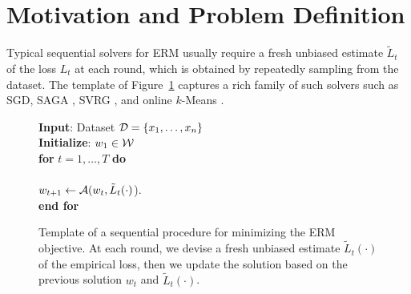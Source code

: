 
\section{Motivation and Problem Definition} \label{sec:Motivation}
Typical sequential solvers for ERM usually require a fresh unbiased estimate $\tilde{L}_t$  of the loss ${L}_t$ at each round, which is obtained by repeatedly sampling from the dataset.
The template of Figure~\ref{fig:ERM_Sequential} captures a rich family of such solvers such as SGD, SAGA \citep{defazio2014saga}, SVRG \citep{johnson2013accelerating}, and online $k$-Means \citep{bottou1995convergence}.

 
 
\begin{figure}[h]
\begin{framed}
 \flushleft
 \textbf{Input}: Dataset ${\mathcal{D}} = \{x_1,\ldots,x_n\}$ \\
  \textbf{Initialize}: $w_1 \in \mathcal{W}$ \\
   \textbf{for} $t=1,\ldots, T$ \textbf{do} \\
    \\
     $w_{t+1} \gets \mathcal{A}( w_t, \tilde{L}_t(\cdot)$). \\
   \textbf{end for} \\
\end{framed}
\caption{ Template of a sequential  procedure for minimizing the ERM objective.
At each round, we devise a fresh unbiased estimate $\tilde{L}_t(\cdot)$ of the empirical loss, then we update the solution based on the previous solution $w_t$ and $\tilde{L}_t(\cdot)$.}
\label{fig:ERM_Sequential}
\end{figure}
 

